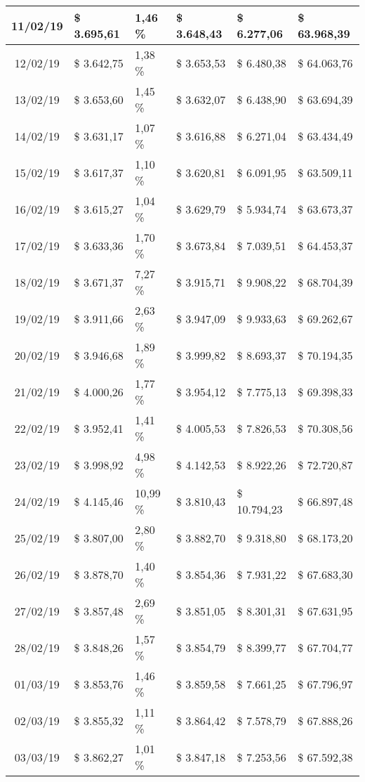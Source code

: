 \begin{small}
\begin{longtable}{|c|l|l|l|l|l|}
11/02/19 & \$ 3.695,61 & 1,46 \% & \$ 3.648,43 & \$ 6.277,06 & \$ 63.968,39 \\ \hline
12/02/19 & \$ 3.642,75 & 1,38 \% & \$ 3.653,53 & \$ 6.480,38 & \$ 64.063,76 \\ \hline
13/02/19 & \$ 3.653,60 & 1,45 \% & \$ 3.632,07 & \$ 6.438,90 & \$ 63.694,39 \\ \hline
14/02/19 & \$ 3.631,17 & 1,07 \% & \$ 3.616,88 & \$ 6.271,04 & \$ 63.434,49 \\ \hline
15/02/19 & \$ 3.617,37 & 1,10 \% & \$ 3.620,81 & \$ 6.091,95 & \$ 63.509,11 \\ \hline
16/02/19 & \$ 3.615,27 & 1,04 \% & \$ 3.629,79 & \$ 5.934,74 & \$ 63.673,37 \\ \hline
17/02/19 & \$ 3.633,36 & 1,70 \% & \$ 3.673,84 & \$ 7.039,51 & \$ 64.453,37 \\ \hline
18/02/19 & \$ 3.671,37 & 7,27 \% & \$ 3.915,71 & \$ 9.908,22 & \$ 68.704,39 \\ \hline
19/02/19 & \$ 3.911,66 & 2,63 \% & \$ 3.947,09 & \$ 9.933,63 & \$ 69.262,67 \\ \hline
20/02/19 & \$ 3.946,68 & 1,89 \% & \$ 3.999,82 & \$ 8.693,37 & \$ 70.194,35 \\ \hline
21/02/19 & \$ 4.000,26 & 1,77 \% & \$ 3.954,12 & \$ 7.775,13 & \$ 69.398,33 \\ \hline
22/02/19 & \$ 3.952,41 & 1,41 \% & \$ 4.005,53 & \$ 7.826,53 & \$ 70.308,56 \\ \hline
23/02/19 & \$ 3.998,92 & 4,98 \% & \$ 4.142,53 & \$ 8.922,26 & \$ 72.720,87 \\ \hline
24/02/19 & \$ 4.145,46 & 10,99 \% & \$ 3.810,43 & \$ 10.794,23 & \$ 66.897,48 \\ \hline
25/02/19 & \$ 3.807,00 & 2,80 \% & \$ 3.882,70 & \$ 9.318,80 & \$ 68.173,20 \\ \hline
26/02/19 & \$ 3.878,70 & 1,40 \% & \$ 3.854,36 & \$ 7.931,22 & \$ 67.683,30 \\ \hline
27/02/19 & \$ 3.857,48 & 2,69 \% & \$ 3.851,05 & \$ 8.301,31 & \$ 67.631,95 \\ \hline
28/02/19 & \$ 3.848,26 & 1,57 \% & \$ 3.854,79 & \$ 8.399,77 & \$ 67.704,77 \\ \hline
01/03/19 & \$ 3.853,76 & 1,46 \% & \$ 3.859,58 & \$ 7.661,25 & \$ 67.796,97 \\ \hline
02/03/19 & \$ 3.855,32 & 1,11 \% & \$ 3.864,42 & \$ 7.578,79 & \$ 67.888,26 \\ \hline
03/03/19 & \$ 3.862,27 & 1,01 \% & \$ 3.847,18 & \$ 7.253,56 & \$ 67.592,38 \\ \hline

\end{longtable}
\end{small}
